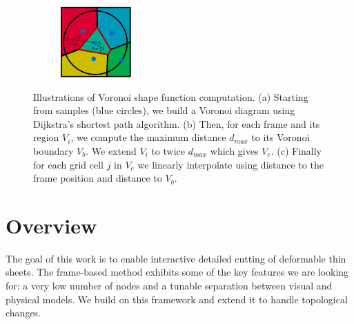 \begin{figure}[!ht]
\begin{subfigure}[b]{0.20\linewidth}
\caption{\label{fig:buildSF2}}
\end{subfigure}
\hspace{2cm}
\begin{subfigure}[b]{0.20\linewidth}
\centering
\includegraphics[width=\linewidth]{images/cutting-mig2015/buildSF_3.pdf}
\caption{\label{fig:buildSF3}}
\end{subfigure}
\caption[Frame-based cutting: Voronoi shapefunction computation]{\label{fig:shapefunctionconstruction}
Illustrations of Voronoi shape function computation. (a) Starting from samples (blue circles), we build a Voronoi diagram using Dijkstra's shortest path algorithm. (b) Then, for each frame and its region $V_{i}$, we compute the maximum distance $d_{max}$ to its Voronoi boundary $V_{b}$. We extend $V_{i}$ to twice $d_{max}$ which gives $V_{e}$. (c) Finally for each grid cell $j$ in $V_{e}$ we linearly interpolate using distance to the frame position and distance to $V_{b}$.}
\end{figure}

\section{Overview}

The goal of this work is to enable interactive detailed cutting of deformable thin sheets. The frame-based method exhibits some of the key features we are looking for: a very low number of nodes and a tunable separation between visual and physical models.  We build on this framework and extend it to handle topological changes.


